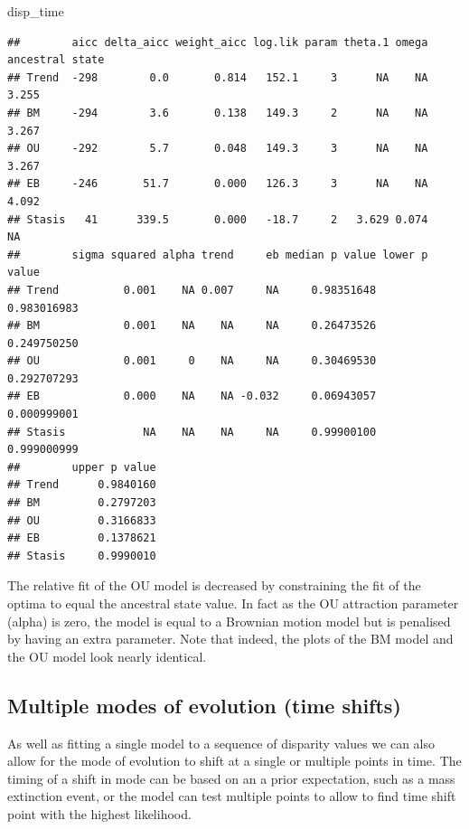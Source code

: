\documentclass[
]{book}
\newenvironment{Shaded}{\begin{snugshade}}{\end{snugshade}}
\newcommand{\NormalTok}[1]{#1}
\begin{document}
\begin{Shaded}
\begin{Highlighting}[]
\NormalTok{disp\_time}
\end{Highlighting}
\end{Shaded}

\begin{verbatim}
##        aicc delta_aicc weight_aicc log.lik param theta.1 omega ancestral state
## Trend  -298        0.0       0.814   152.1     3      NA    NA           3.255
## BM     -294        3.6       0.138   149.3     2      NA    NA           3.267
## OU     -292        5.7       0.048   149.3     3      NA    NA           3.267
## EB     -246       51.7       0.000   126.3     3      NA    NA           4.092
## Stasis   41      339.5       0.000   -18.7     2   3.629 0.074              NA
##        sigma squared alpha trend     eb median p value lower p value
## Trend          0.001    NA 0.007     NA     0.98351648   0.983016983
## BM             0.001    NA    NA     NA     0.26473526   0.249750250
## OU             0.001     0    NA     NA     0.30469530   0.292707293
## EB             0.000    NA    NA -0.032     0.06943057   0.000999001
## Stasis            NA    NA    NA     NA     0.99900100   0.999000999
##        upper p value
## Trend      0.9840160
## BM         0.2797203
## OU         0.3166833
## EB         0.1378621
## Stasis     0.9990010
\end{verbatim}

The relative fit of the OU model is decreased by constraining the fit of the optima to equal the ancestral state value.
In fact as the OU attraction parameter (alpha) is zero, the model is equal to a Brownian motion model but is penalised by having an extra parameter.
Note that indeed, the plots of the BM model and the OU model look nearly identical.

\hypertarget{multiple-modes-of-evolution-time-shifts}{%
\subsection{Multiple modes of evolution (time shifts)}\label{multiple-modes-of-evolution-time-shifts}}

As well as fitting a single model to a sequence of disparity values we can also allow for the mode of evolution to shift at a single or multiple points in time.
The timing of a shift in mode can be based on an a prior expectation, such as a mass extinction event, or the model can test multiple points to allow to find time shift point with the highest likelihood.
\end{document}
